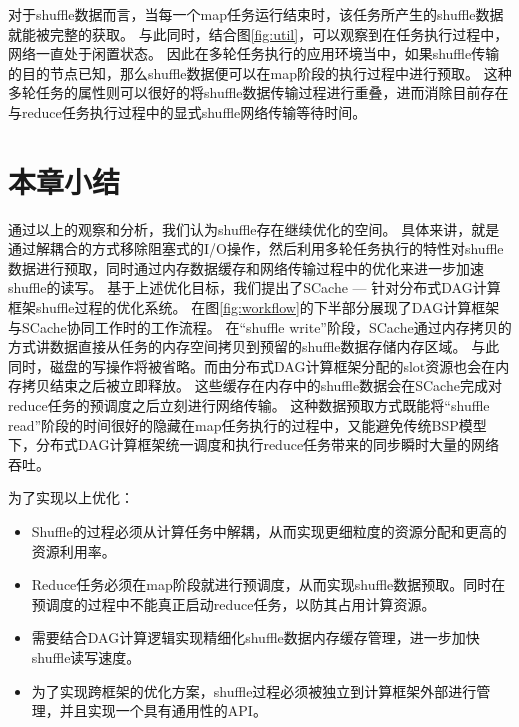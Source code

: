 对于shuffle数据而言，当每一个map任务运行结束时，该任务所产生的shuffle数据就能被完整的获取。
与此同时，结合图\ref{fig:util}，可以观察到在任务执行过程中，网络一直处于闲置状态。
因此在多轮任务执行的应用环境当中，如果shuffle传输的目的节点已知，那么shuffle数据便可以在map阶段的执行过程中进行预取。
这种多轮任务的属性则可以很好的将shuffle数据传输过程进行重叠，进而消除目前存在与reduce任务执行过程中的显式shuffle网络传输等待时间。

\section{本章小结}
通过以上的观察和分析，我们认为shuffle存在继续优化的空间。
具体来讲，就是通过解耦合的方式移除阻塞式的I/O操作，然后利用多轮任务执行的特性对shuffle数据进行预取，同时通过内存数据缓存和网络传输过程中的优化来进一步加速shuffle的读写。
基于上述优化目标，我们提出了SCache --- 针对分布式DAG计算框架shuffle过程的优化系统。
在图\ref{fig:workflow}的下半部分展现了DAG计算框架与SCache协同工作时的工作流程。
在“shuffle write”阶段，SCache通过内存拷贝的方式讲数据直接从任务的内存空间拷贝到预留的shuffle数据存储内存区域。
与此同时，磁盘的写操作将被省略。而由分布式DAG计算框架分配的slot资源也会在内存拷贝结束之后被立即释放。
这些缓存在内存中的shuffle数据会在SCache完成对reduce任务的预调度之后立刻进行网络传输。
这种数据预取方式既能将“shuffle read”阶段的时间很好的隐藏在map任务执行的过程中，又能避免传统BSP模型下，分布式DAG计算框架统一调度和执行reduce任务带来的同步瞬时大量的网络吞吐。

为了实现以上优化：
\begin{itemize}
	\item Shuffle的过程必须从计算任务中解耦，从而实现更细粒度的资源分配和更高的资源利用率。
	\item Reduce任务必须在map阶段就进行预调度，从而实现shuffle数据预取。同时在预调度的过程中不能真正启动reduce任务，以防其占用计算资源。
	\item 需要结合DAG计算逻辑实现精细化shuffle数据内存缓存管理，进一步加快shuffle读写速度。
	\item 为了实现跨框架的优化方案，shuffle过程必须被独立到计算框架外部进行管理，并且实现一个具有通用性的API。
\end{itemize}
